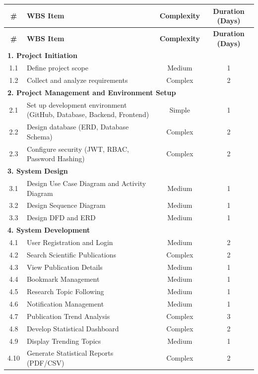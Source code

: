 \documentclass[12pt,a4paper]{article}
\begin{document}
	\begin{longtable}{|c|p{9cm}|c|c|}
		\hline
		\rowcolor{HeaderGray}
		\textbf{\#} & \textbf{WBS Item} & \textbf{Complexity} & \textbf{Duration (Days)}\\
		\hline
		\endfirsthead
		
		\hline
		\rowcolor{HeaderGray}
		\textbf{\#} & \textbf{WBS Item} & \textbf{Complexity} & \textbf{Duration (Days)}\\
		\hline
		\endhead
		
		\multicolumn{4}{|l|}{\textbf{1. Project Initiation}}\\
		\hline
		1.1 & Define project scope & \cellcolor{Medium} Medium & 1\\
		\hline
		1.2 & Collect and analyze requirements & \cellcolor{Complex} Complex & 2\\
		\hline
		
		\multicolumn{4}{|l|}{\textbf{2. Project Management and Environment Setup}}\\
		\hline
		2.1 & Set up development environment (GitHub, Database, Backend, Frontend) & \cellcolor{Simple} Simple & 1\\
		\hline
		2.2 & Design database (ERD, Database Schema) & \cellcolor{Complex} Complex & 2\\
		\hline
		2.3 & Configure security (JWT, RBAC, Password Hashing) & \cellcolor{Complex} Complex & 2\\
		\hline
		
		\multicolumn{4}{|l|}{\textbf{3. System Design}}\\
		\hline
		3.1 & Design Use Case Diagram and Activity Diagram & \cellcolor{Medium} Medium & 1\\
		\hline
		3.2 & Design Sequence Diagram & \cellcolor{Medium} Medium & 1\\
		\hline
		3.3 & Design DFD and ERD & \cellcolor{Medium} Medium & 1\\
		\hline
		
		\multicolumn{4}{|l|}{\textbf{4. System Development}}\\
		\hline
		4.1 & User Registration and Login & \cellcolor{Medium} Medium & 2\\
		\hline
		4.2 & Search Scientific Publications & \cellcolor{Complex} Complex & 2\\
		\hline
		4.3 & View Publication Details & \cellcolor{Medium} Medium & 1\\
		\hline
		4.4 & Bookmark Management & \cellcolor{Medium} Medium & 1\\
		\hline
		4.5 & Research Topic Following & \cellcolor{Medium} Medium & 1\\
		\hline
		4.6 & Notification Management & \cellcolor{Medium} Medium & 1\\
		\hline
		4.7 & Publication Trend Analysis & \cellcolor{Complex} Complex & 3\\
		\hline
		4.8 & Develop Statistical Dashboard & \cellcolor{Complex} Complex & 2\\
		\hline
		4.9 & Display Trending Topics & \cellcolor{Medium} Medium & 1\\
		\hline
		4.10 & Generate Statistical Reports (PDF/CSV) & \cellcolor{Complex} Complex & 2\\
		\hline
		

\end{longtable}
\end{document}
